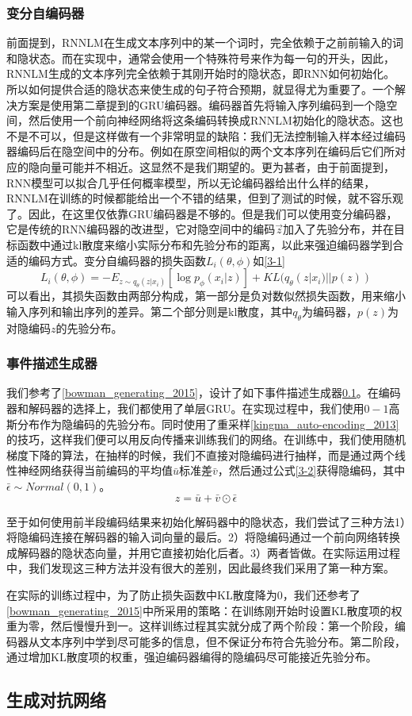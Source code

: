 \documentclass[]{template}
\begin{document}
\subsubsection{变分自编码器}
前面提到，RNNLM在生成文本序列中的某一个词时，完全依赖于之前前输入的词和隐状态。而在实现中，通常会使用一个特殊符号来作为每一句的开头，因此，RNNLM生成的文本序列完全依赖于其刚开始时的隐状态，即RNN如何初始化。所以如何提供合适的隐状态来使生成的句子符合预期，就显得尤为重要了。一个解决方案是使用第二章提到的GRU编码器。编码器首先将输入序列编码到一个隐空间，然后使用一个前向神经网络将这条编码转换成RNNLM初始化的隐状态。这也不是不可以，但是这样做有一个非常明显的缺陷：我们无法控制输入样本经过编码器编码后在隐空间中的分布。例如在原空间相似的两个文本序列在编码后它们所对应的隐向量可能并不相近。这显然不是我们期望的。更为甚者，由于前面提到，RNN模型可以拟合几乎任何概率模型，所以无论编码器给出什么样的结果，RNNLM在训练的时候都能给出一个不错的结果，但到了测试的时候，就不容乐观了。因此，在这里仅依靠GRU编码器是不够的。但是我们可以使用变分编码器，它是传统的RNN编码器的改进型，它对隐空间中的编码\(\overrightarrow{z}\)加入了先验分布，并在目标函数中通过kl散度来缩小实际分布和先验分布的距离，以此来强迫编码器学到合适的编码方式。变分自编码器的损失函数$L_i(\theta,\phi)$如\ref{3-1}
\begin{equation}\label{3-1}
    L_i(\theta,\phi)=-E_{z\sim q_\theta(z|x_i)}[\log p_\phi(x_i|z)]+KL (q_\theta(z|x_i)||p(z))
\end{equation}
可以看出，其损失函数由两部分构成，第一部分是负对数似然损失函数，用来缩小输入序列和输出序列的差异。第二个部分则是kl散度，其中$q_\theta$为编码器，$p(z)$为对隐编码$z$的先验分布。

\subsubsection{事件描述生成器}
我们参考了\ref{bowman_generating_2015}，设计了如下事件描述生成器\ref{}。在编码器和解码器的选择上，我们都使用了单层GRU。在实现过程中，我们使用$0-1$高斯分布作为隐编码的先验分布。同时使用了重采样\ref{kingma_auto-encoding_2013}的技巧，这样我们便可以用反向传播来训练我们的网络。在训练中，我们使用随机梯度下降的算法，在抽样的时候，我们不直接对隐编码进行抽样，而是通过两个线性神经网络获得当前编码的平均值$\bar{u}$标准差$\bar{v}$，然后通过公式\ref{3-2}获得隐编码，其中$\bar\epsilon \sim Normal(0,1)$。
\begin{equation}\label{3-2}
    z=\bar{u}+\bar{v}\odot \bar\epsilon
\end{equation}

至于如何使用前半段编码结果来初始化解码器中的隐状态，我们尝试了三种方法1）将隐编码连接在解码器的输入词向量的最后。2）将隐编码通过一个前向网络转换成解码器的隐状态向量，并用它直接初始化后者。3）两者皆做。在实际运用过程中，我们发现这三种方法并没有很大的差别，因此最终我们采用了第一种方案。

在实际的训练过程中，为了防止损失函数中KL散度降为0，我们还参考了\ref{bowman_generating_2015}中所采用的策略：在训练刚开始时设置KL散度项的权重为零，然后慢慢升到一。这样训练过程其实就分成了两个阶段：第一个阶段，编码器从文本序列中学到尽可能多的信息，但不保证分布符合先验分布。第二阶段，通过增加KL散度项的权重，强迫编码器编得的隐编码尽可能接近先验分布。

\subsection{生成对抗网络}
\end{document}
